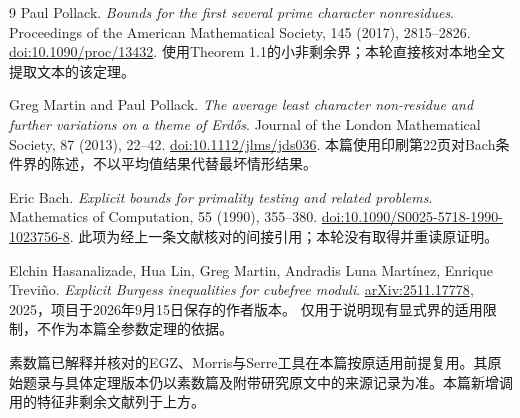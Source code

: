 \backmatter
\begin{thebibliography}{9}
Paul Pollack.
\emph{Bounds for the first several prime character nonresidues}.
Proceedings of the American Mathematical Society, 145 (2017), 2815--2826.
\href{https://doi.org/10.1090/proc/13432}{doi:10.1090/proc/13432}.
使用Theorem 1.1的小非剩余界；本轮直接核对本地全文提取文本的该定理。

Greg Martin and Paul Pollack.
\emph{The average least character non-residue and further variations on a theme of Erdős}.
Journal of the London Mathematical Society, 87 (2013), 22--42.
\href{https://doi.org/10.1112/jlms/jds036}{doi:10.1112/jlms/jds036}.
本篇使用印刷第22页对Bach条件界的陈述，不以平均值结果代替最坏情形结果。

Eric Bach.
\emph{Explicit bounds for primality testing and related problems}.
Mathematics of Computation, 55 (1990), 355--380.
\href{https://doi.org/10.1090/S0025-5718-1990-1023756-8}{doi:10.1090/S0025-5718-1990-1023756-8}.
此项为经上一条文献核对的间接引用；本轮没有取得并重读原证明。

Elchin Hasanalizade, Hua Lin, Greg Martin, Andradis Luna Martínez, Enrique Treviño.
\emph{Explicit Burgess inequalities for cubefree moduli}.
\href{https://arxiv.org/abs/2511.17778}{arXiv:2511.17778}, 2025，项目于2026年9月15日保存的作者版本。
仅用于说明现有显式界的适用限制，不作为本篇全参数定理的依据。
\end{thebibliography}

素数篇已解释并核对的EGZ、Morris与Serre工具在本篇按原适用前提复用。其原始题录与具体定理版本仍以素数篇及附带研究原文中的来源记录为准。本篇新增调用的特征非剩余文献列于上方。

